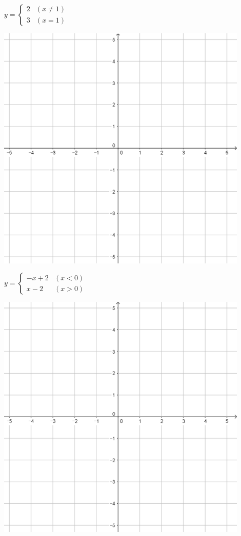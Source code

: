 \documentclass[a4paper]{oblivoir}
\begin{document}
\begin{minipage}{0.45\textwidth}\centering
\(y=\begin{cases}2&(x\neq1)\\3&(x=1)\end{cases}\)
\par\bigskip\includegraphics[width=0.9\textwidth]{55}
\end{minipage}
\begin{minipage}{0.45\textwidth}\centering
\(y=\begin{cases}-x+2&(x<0)\\x-2&(x>0)\end{cases}\)
\par\bigskip\includegraphics[width=0.9\textwidth]{55}
\end{minipage}\bigskip\bigskip\par
\end{document}
